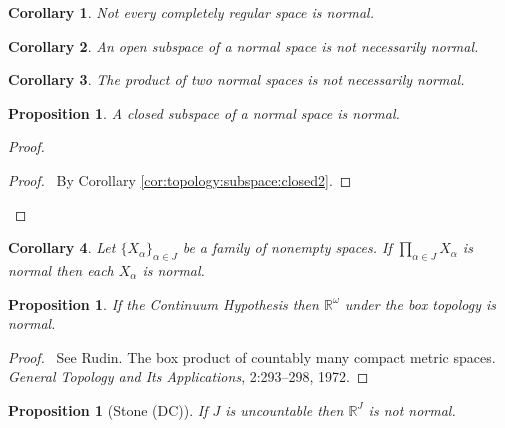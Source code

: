 \documentclass{report}
\let\qed\relax
\newtheorem{prop}[lm]{Proposition}
\newtheorem{cor}{Corollary}[lm]
\theoremstyle{definition}
\begin{document}
  \begin{cor}
   Not every completely regular space is normal.
  \end{cor}

  \begin{cor}
   An open subspace of a normal space is not necessarily normal.
  \end{cor}

  \begin{cor}
   The product of two normal spaces is not necessarily normal.
  \end{cor}

  \begin{prop}
   A closed subspace of a normal space is normal.
  \end{prop}

  \begin{proof}
   \pf
   \begin{proof}
     \pf\ By Corollary \ref{cor:topology:subspace:closed2}.
   \end{proof}
   \qed
  \end{proof}

  \begin{cor}
    Let $\{X_\alpha\}_{\alpha \in J}$ be a family of nonempty spaces. If
    $\prod_{\alpha \in J} X_\alpha$ is normal then each $X_\alpha$ is normal.
  \end{cor}

    \begin{prop}
    If the Continuum Hypothesis then $\mathbb{R}^\omega$ under the box topology
    is normal.
  \end{prop}

  \begin{proof}
    \pf\ See Rudin. The box product of countably many compact metric spaces.
    \emph{General Topology and Its Applications}, 2:293--298, 1972. \qed
  \end{proof}

    \begin{prop}[Stone (DC)]
      \label{prop:topology:normal:uncountable}
    If $J$ is uncountable then $\mathbb{R}^J$ is not normal.
  \end{prop}
\end{document}
